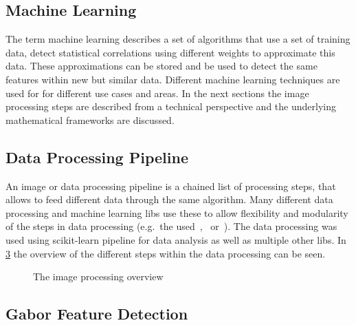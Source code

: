 \documentclass[12pt,a4paper, english]{article}
\begin{document}
    \subsection{Machine Learning}\label{sec:ml}
    The term machine learning describes a set of algorithms that use a set of training data, detect statistical correlations using different weights to approximate this data. %
    These approximations can be stored and be used to detect the same features within new but similar data.
    Different machine learning techniques are used for for different use cases and areas.
%
  In the next sections the image processing steps are described from a technical perspective and the underlying mathematical frameworks are discussed.
%
    \subsection{Data Processing Pipeline}
    An image or data processing pipeline is a chained list of processing steps, that allows to feed different data through the same algorithm. 
    Many different data processing and machine learning \glspl{lib} use these to allow flexibility and modularity of the steps in data processing (e.g.\ the used~\cite{scikit-learn},~\cite{keras} or~\cite{gluon}). 
    The data processing was used using scikit-learn pipeline for data analysis as well as multiple other \glspl{lib}. 
    In \cref{fig:pipeline} the overview of the different steps within the data processing can be seen.
%
    \begin{figure}[!htbp]
       \begin{subfigure}[b]{0.50\textwidth}
         
         \label{fig:pipelineTraining}
       \end{subfigure}
       \begin{subfigure}[b]{0.50\textwidth}
         
         \label{fig:pipelineTrained}
       \end{subfigure}
       \caption{The image processing overview\label{fig:pipeline}}
     \end{figure}
%
\newpage
\subsection{Gabor Feature Detection}\label{sec:gabor}
\end{document}
